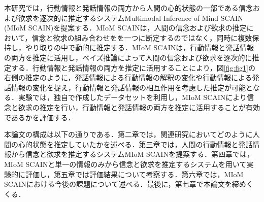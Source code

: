 
\par
本研究では，行動情報と発話情報の両方から人間の心的状態の一部である信念および欲求を逐次的に推定するシステムMultimodal Inference of Mind SCAIN (MIoM SCAIN)を提案する．MIoM SCAINは，人間の信念および欲求の推定において，信念と欲求の組み合わせをを一つに断定するのではなく，同時に複数保持し，やり取りの中で動的に推定する．MIoM SCAINは，行動情報と発話情報の両方を推定に活用し，ベイズ推論によって人間の信念および欲求を逐次的に推定する．行動情報と発話情報の両方を推定に活用することにより，図\ref{fig:fig1}の右側の推定のように，発話情報による行動情報の解釈の変化や行動情報による発話情報の変化を捉え，行動情報と発話情報の相互作用を考慮した推定が可能となる．実験では，独自で作成したデータセットを利用し，MIoM SCAINにより信念と欲求の推定を行い，行動情報と発話情報の両方を推定に活用することが有効であるかを評価する．

\par
本論文の構成は以下の通りである．第二章では，関連研究においてどのように人間の心的状態を推定していたかを述べる．第三章では，人間の行動情報と発話情報から信念と欲求を推定するシステムMIoM SCAINを提案する．第四章では，MIoM SCAINと単一の情報のみから信念と欲求を推定するシステムを用いて実験的に評価し，第五章では評価結果について考察する．第六章では，MIoM SCAINにおける今後の課題について述べる．最後に，第七章で本論文を締めくくる．
